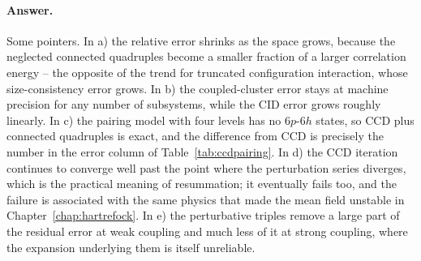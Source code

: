 \paragraph{Answer.}
Some pointers.  In a) the relative error shrinks as the space grows, because
the neglected connected quadruples become a smaller fraction of a larger
correlation energy -- the opposite of the trend for truncated configuration
interaction, whose size-consistency error grows.  In b) the coupled-cluster
error stays at machine precision for any number of subsystems, while the CID
error grows roughly linearly.  In c) the pairing model with four levels has
no $6p$-$6h$ states, so CCD plus connected quadruples is exact, and the
difference from CCD is precisely the number in the error column of
Table~\ref{tab:ccdpairing}.  In d) the CCD iteration continues to converge
well past the point where the perturbation series diverges, which is the
practical meaning of resummation; it eventually fails too, and the failure is
associated with the same physics that made the mean field unstable in
Chapter~\ref{chap:hartrefock}.  In e) the perturbative triples remove a large
part of the residual error at weak coupling and much less of it at strong
coupling, where the expansion underlying them is itself unreliable.
